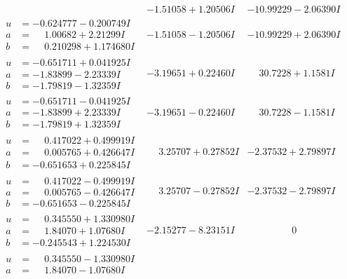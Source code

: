 \documentclass[1p]{elsarticle_modified}
\theoremstyle{definition}
\begin{document}
$$\begin{array}{c|c|c}
 & -1.51058 + 1.20506 I & -10.99229 - 2.06390 I \\ \hline\begin{aligned}
u &= -0.624777 - 0.200749 I \\
a &= \phantom{-}1.00682 + 2.21299 I \\
b &= \phantom{-}0.210298 + 1.174680 I\end{aligned}
 & -1.51058 - 1.20506 I & -10.99229 + 2.06390 I \\ \hline\begin{aligned}
u &= -0.651711 + 0.041925 I \\
a &= -1.83899 - 2.23339 I \\
b &= -1.79819 - 1.32359 I\end{aligned}
 & -3.19651 + 0.22460 I & \phantom{-}30.7228 + 1.1581 I \\ \hline\begin{aligned}
u &= -0.651711 - 0.041925 I \\
a &= -1.83899 + 2.23339 I \\
b &= -1.79819 + 1.32359 I\end{aligned}
 & -3.19651 - 0.22460 I & \phantom{-}30.7228 - 1.1581 I \\ \hline\begin{aligned}
u &= \phantom{-}0.417022 + 0.499919 I \\
a &= \phantom{-}0.005765 + 0.426647 I \\
b &= -0.651653 + 0.225845 I\end{aligned}
 & \phantom{-}3.25707 + 0.27852 I & -2.37532 + 2.79897 I \\ \hline\begin{aligned}
u &= \phantom{-}0.417022 - 0.499919 I \\
a &= \phantom{-}0.005765 - 0.426647 I \\
b &= -0.651653 - 0.225845 I\end{aligned}
 & \phantom{-}3.25707 - 0.27852 I & -2.37532 - 2.79897 I \\ \hline\begin{aligned}
u &= \phantom{-}0.345550 + 1.330980 I \\
a &= \phantom{-}1.84070 + 1.07680 I \\
b &= -0.245543 + 1.224530 I\end{aligned}
 & -2.15277 - 8.23151 I & \phantom{-0.000000 } 0 \\ \hline\begin{aligned}
u &= \phantom{-}0.345550 - 1.330980 I \\
a &= \phantom{-}1.84070 - 1.07680 I \\

\end{aligned}
\end{array}$$
\end{document}
